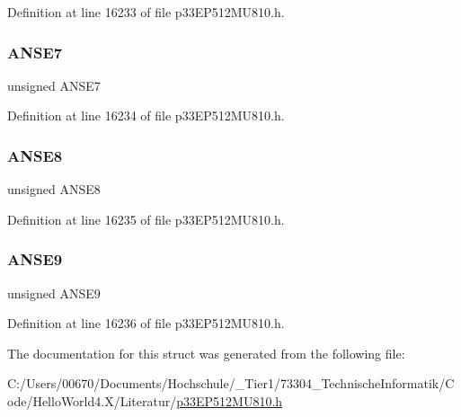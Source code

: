 Definition at line 16233 of file p33\+E\+P512\+M\+U810.\+h.

\mbox{\label{structtag_a_n_s_e_l_e_b_i_t_s_a70285d3255a7f95d499dfc521fe8a012}} 
\subsubsection{\texorpdfstring{A\+N\+S\+E7}{ANSE7}}
{\footnotesize\ttfamily unsigned A\+N\+S\+E7}



Definition at line 16234 of file p33\+E\+P512\+M\+U810.\+h.

\mbox{\label{structtag_a_n_s_e_l_e_b_i_t_s_acc9fe213f7b1fc14324de3cab03c235b}} 
\subsubsection{\texorpdfstring{A\+N\+S\+E8}{ANSE8}}
{\footnotesize\ttfamily unsigned A\+N\+S\+E8}



Definition at line 16235 of file p33\+E\+P512\+M\+U810.\+h.

\mbox{\label{structtag_a_n_s_e_l_e_b_i_t_s_af7cef197534c139cd4dc549a08cdac2e}} 
\subsubsection{\texorpdfstring{A\+N\+S\+E9}{ANSE9}}
{\footnotesize\ttfamily unsigned A\+N\+S\+E9}



Definition at line 16236 of file p33\+E\+P512\+M\+U810.\+h.



The documentation for this struct was generated from the following file\+:\begin{DoxyCompactItemize}
\item 
C\+:/\+Users/00670/\+Documents/\+Hochschule/\+\_\+\+Tier1/73304\+\_\+\+Technische\+Informatik/\+Code/\+Hello\+World4.\+X/\+Literatur/\hyperlink{p33_e_p512_m_u810_8h}{p33\+E\+P512\+M\+U810.\+h}\end{DoxyCompactItemize}
